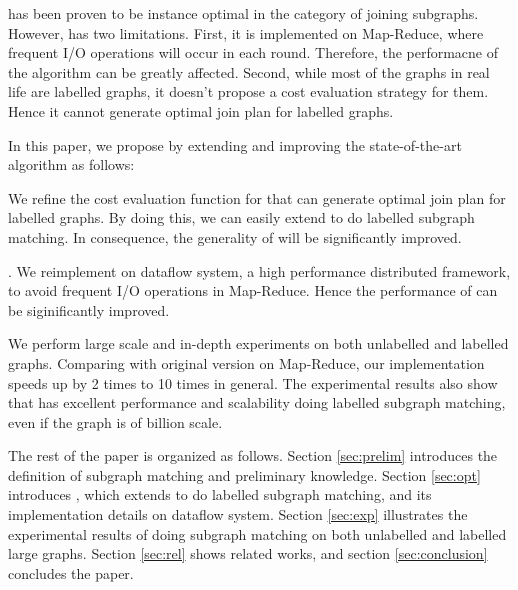  \cliquejoin has been proven to be instance optimal in the category of joining subgraphs\cite{Lai2016}. However, \cliquejoin has two limitations. First, it is implemented on Map-Reduce, where frequent I/O operations will occur in each round. Therefore, the performacne of the algorithm can be greatly affected. Second, while most of the graphs in real life are labelled graphs, it doesn't propose a cost evaluation strategy for them. Hence it cannot generate optimal join plan for labelled graphs.

 In this paper, we propose \gencliqjoin by extending and improving the state-of-the-art algorithm \cliquejoin as follows:

 We refine the cost evaluation function for \cliquejoin that can generate optimal join plan for labelled graphs. By doing this, we can easily extend \cliquejoin to do labelled subgraph matching. In consequence, the generality of \cliquejoin will be significantly improved.

\cite{Murray2013}. We reimplement \cliquejoin on \timely dataflow system, a high performance distributed framework, to avoid frequent I/O operations in Map-Reduce. Hence the performance of \cliquejoin can be siginificantly improved.

 We perform large scale and in-depth experiments on both unlabelled and labelled graphs. Comparing with original version on Map-Reduce, our implementation speeds up \cliquejoin by 2 times to 10 times in general. The experimental results also show that \gencliqjoin has excellent performance and scalability doing labelled subgraph matching, even if the graph is of billion scale.

 The rest of the paper is organized as follows. Section \ref{sec:prelim} introduces the definition of subgraph matching and preliminary knowledge. Section \ref{sec:opt} introduces \gencliqjoin, which extends \cliquejoin to do labelled subgraph matching, and its implementation details on \timely dataflow system. Section \ref{sec:exp} illustrates the experimental results of doing subgraph matching on both unlabelled and labelled large graphs. Section \ref{sec:rel} shows related works, and section \ref{sec:conclusion} concludes the paper.